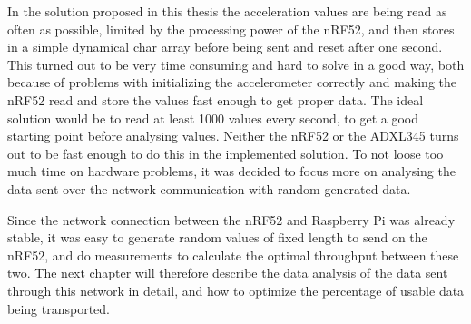 In the solution proposed in this thesis the acceleration values are being read as often as possible, limited by the processing power of the nRF52, and then stores in a simple dynamical char array before being sent and reset after one second. This turned out to be very time consuming and hard to solve in a good way, both because of problems with initializing the accelerometer correctly and making the nRF52 read and store the values fast enough to get proper data. The ideal solution would be to read at least 1000 values every second, to get a good starting point before analysing values. Neither the nRF52 or the ADXL345 turns out to be fast enough to do this in the implemented solution.  To not loose too much time on hardware problems, it was decided to focus more on analysing the data sent over the network communication with random generated data. 

Since the network connection between the nRF52 and Raspberry Pi was already stable, it was easy to generate random values of fixed length to send on the nRF52, and do measurements to calculate the optimal throughput between these two. The next chapter will therefore describe the data analysis of the data sent through this network in detail, and how to optimize the percentage of usable data being transported.  




